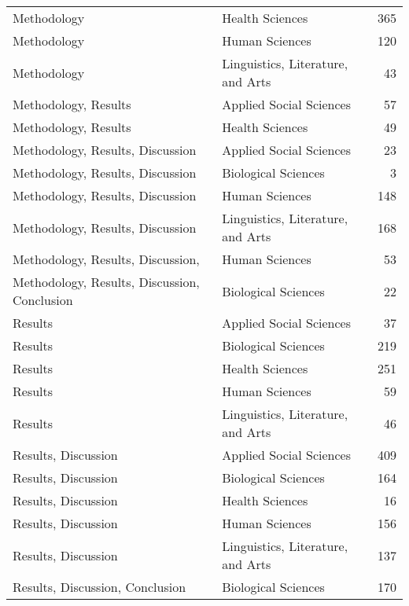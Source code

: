\begin{longtable}{llr}
Methodology & Health Sciences & 365 \\
Methodology & Human Sciences & 120 \\
Methodology & Linguistics, Literature, and Arts & 43 \\
Methodology, Results & Applied Social Sciences & 57 \\
Methodology, Results & Health Sciences & 49 \\
Methodology, Results, Discussion & Applied Social Sciences & 23 \\
Methodology, Results, Discussion & Biological Sciences & 3 \\
Methodology, Results, Discussion & Human Sciences & 148 \\
Methodology, Results, Discussion & Linguistics, Literature, and Arts & 168 \\
Methodology, Results, Discussion, & Human Sciences & 53 \\
Methodology, Results, Discussion, Conclusion & Biological Sciences & 22 \\
Results & Applied Social Sciences & 37 \\
Results & Biological Sciences & 219 \\
Results & Health Sciences & 251 \\
Results & Human Sciences & 59 \\
Results & Linguistics, Literature, and Arts & 46 \\
Results, Discussion & Applied Social Sciences & 409 \\
Results, Discussion & Biological Sciences & 164 \\
Results, Discussion & Health Sciences & 16 \\
Results, Discussion & Human Sciences & 156 \\
Results, Discussion & Linguistics, Literature, and Arts & 137 \\
Results, Discussion, Conclusion & Biological Sciences & 170 \\
\end{longtable}
